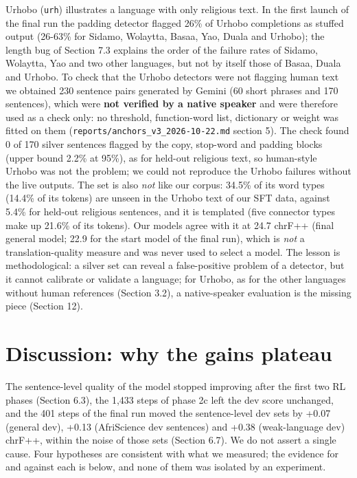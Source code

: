 Urhobo (\texttt{urh}) illustrates a language with only religious text. In the first launch of the final run the padding detector flagged 26\% of Urhobo completions as stuffed output (26-63\% for Sidamo, Wolaytta, Basaa, Yao, Duala and Urhobo); the length bug of Section 7.3 explains the order of the failure rates of Sidamo, Wolaytta, Yao and two other languages, but not by itself those of Basaa, Duala and Urhobo. To check that the Urhobo detectors were not flagging human text we obtained 230 sentence pairs generated by Gemini (60 short phrases and 170 sentences), which were \textbf{not verified by a native speaker} and were therefore used as a check only: no threshold, function-word list, dictionary or weight was fitted on them (\texttt{reports/anchors\_v3\_2026-10-22.md} section 5). The check found 0 of 170 silver sentences flagged by the copy, stop-word and padding blocks (upper bound 2.2\% at 95\%), as for held-out religious text, so human-style Urhobo was not the problem; we could not reproduce the Urhobo failures without the live outputs. The set is also \emph{not} like our corpus: 34.5\% of its word types (14.4\% of its tokens) are unseen in the Urhobo text of our SFT data, against 5.4\% for held-out religious sentences, and it is templated (five connector types make up 21.6\% of its tokens). Our models agree with it at 24.7 chrF++ (final general model; 22.9 for the start model of the final run), which is \emph{not} a translation-quality measure and was never used to select a model. The lesson is methodological: a silver set can reveal a false-positive problem of a detector, but it cannot calibrate or validate a language; for Urhobo, as for the other languages without human references (Section 3.2), a native-speaker evaluation is the missing piece (Section 12).

\section{Discussion: why the gains plateau}\label{discussion-why-the-gains-plateau}

The sentence-level quality of the model stopped improving after the first two RL phases (Section 6.3), the 1,433 steps of phase 2c left the dev score unchanged, and the 401 steps of the final run moved the sentence-level dev sets by +0.07 (general dev), +0.13 (AfriScience dev sentences) and +0.38 (weak-language dev) chrF++, within the noise of those sets (Section 6.7). We do not assert a single cause. Four hypotheses are consistent with what we measured; the evidence for and against each is below, and none of them was isolated by an experiment.

